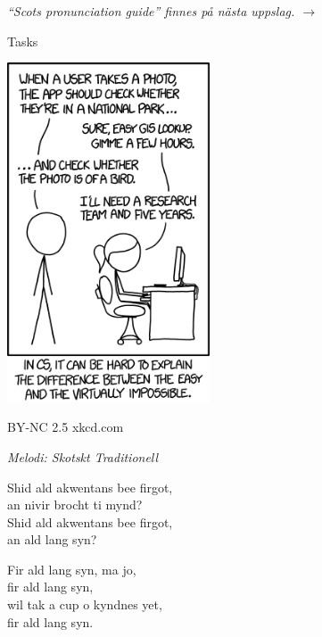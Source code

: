 \vspace{15pt}
{\footnotesize\textit{``Scots pronunciation guide'' finnes på nästa uppslag. $\rightarrow$}}\par
\vfill
{}
\begin{center}
  \tiny{Tasks}\par
  \vspace{5pt}
  \includegraphics[keepaspectratio,width=0.45\textwidth]{elements/images/tasks.png}\par
  \vspace{5pt}
  \tiny{BY-NC 2.5 xkcd.com}
\end{center}
\par
\vfill
\newpage
{}
{\footnotesize\textit{Melodi: Skotskt Traditionell}}\par
\vspace{10pt}
Shid ald akwentans bee firgot,\\
an nivir brocht ti mynd?\\
Shid ald akwentans bee firgot,\\
an ald lang syn?\par
\vspace{9pt}
Fir ald lang syn, ma jo,\\
fir ald lang syn,\\
wil tak a cup o kyndnes yet,\\
fir ald lang syn.\par
\vspace{9pt}
